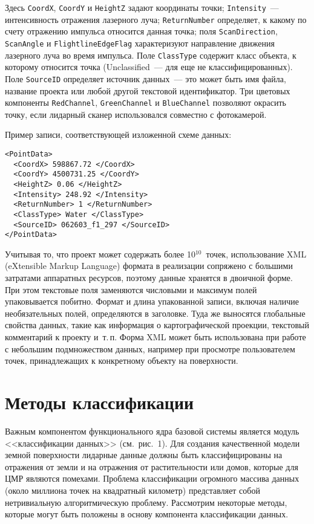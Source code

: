 \begin{multicols}{2}

Здесь \verb"CoordX", \verb*"CoordY" и \verb*"HeightZ" задают координаты 
точки; \verb*"Intensity"~---интенсивность отражения лазерного луча; 
\verb*"ReturnNumber" определяет, к какому по счету отражению импульса 
относится данная точка; поля \verb*"ScanDirection", \verb*"ScanAngle" и 
\verb*"FlightlineEdgeFlag" характеризуют направление движения лазерного 
луча во время импульса. Поле \verb*"ClassType" содержит класс объекта, к 
которому относится точка (Unclassified~--- для еще не классифицированных). 
Поле \verb*"SourceID" определяет источник данных~--- это может быть имя 
файла, название проекта или любой другой текс\-то\-вой идентификатор. Три 
цветовых компоненты \verb*"RedChannel", \verb*"GreenChannel" и 
\verb*"BlueChannel" позволяют окрасить точку, если лидарный сканер 
использовался совместно с фотокамерой.

   Пример записи, соответствующей изложенной схеме данных:
   
   \noindent
   \begin{verbatim}
<PointData>
  <CoordX> 598867.72 </CoordX>
  <CoordY> 4500731.25 </CoordY>
  <HeightZ> 0.06 </HeightZ>
  <Intensity> 248.92 </Intensity>
  <ReturnNumber> 1 </ReturnNumber>
  <ClassType> Water </ClassType>
  <SourceID> 062603_f1_297 </SourceID>
</PointData>
   \end{verbatim}
   
   Учитывая то, что проект может содержать более 10$^{10}$~точек, 
использование XML (eXtensible Markup Language) формата в реализации сопряжено с большими затратами 
аппаратных ресурсов, поэтому данные хранятся в двоичной форме. При этом 
текстовые поля заменяются чис\-ло\-вы\-ми и максимум полей упаковывается 
побитно. Формат и длина упакованной записи, включая наличие 
необязательных полей, определяются в заголовке. Туда же выносятся 
глобальные свойства данных, такие как информация о картографической 
проекции, текс\-то\-вый комментарий к проекту и~т.\,п. Форма XML может быть 
использована при работе с небольшим подмножеством данных, например при 
просмотре пользователем точек, принадлежащих к конкретному объекту на 
поверхности.

\section{Методы классификации}
     
   Важным компонентом функционального ядра базовой системы является 
модуль <<классификации данных>> (см.\ рис.~1). Для создания 
качественной модели земной поверхности лидарные данные должны быть 
классифицированы на отражения от земли и на отражения от растительности 
или домов, которые для ЦМР являются помехами. Проб\-ле\-ма классификации 
огромного массива данных (около миллиона точек на квадратный километр) 
пред\-ставляет собой нетривиальную алгоритмическую проб\-ле\-му. Рассмотрим 
некоторые методы, которые могут быть положены в основу компонента 
классификации данных.


\end{multicols}
